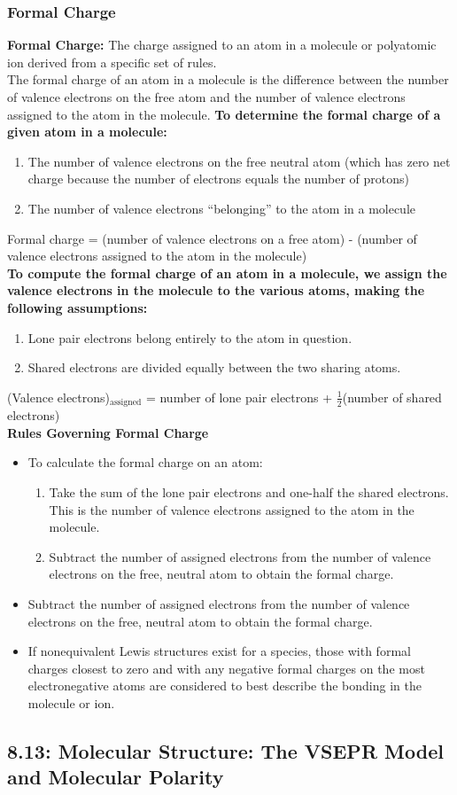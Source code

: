 \documentclass[12pt]{extarticle}
\begin{document}
\subsubsection*{Formal Charge}
\textbf{Formal Charge:}
The charge assigned to an atom in a molecule or polyatomic ion derived from a specific set of rules.
\\The formal charge of an atom in a molecule is  the difference between the number of valence electrons on the free atom and the number of valence electrons assigned to the atom in the molecule.
\textbf{To determine the formal charge of a given atom in a molecule:}
\begin{enumerate}
    \item The number of valence electrons on the free neutral atom (which has zero net charge because the number of electrons equals the number of protons)
    \item The number of valence electrons “belonging” to the atom in a molecule
\end{enumerate}
Formal charge = (number of valence electrons on a free atom) - (number of valence electrons assigned to the atom in the molecule)
\\\textbf{To compute the formal charge of an atom in a molecule, we assign the valence electrons in the molecule to the various atoms, making the following assumptions:}
\begin{enumerate}
    \item Lone pair electrons belong entirely to the atom in question.
    \item Shared electrons are divided equally between the two sharing atoms.
\end{enumerate}
(Valence electrons)$_{\text{assigned}}$ = number of lone pair electrons + $\frac{1}{2}$(number of shared electrons)
\\\textbf{Rules Governing Formal Charge}
\begin{itemize}
    \item To calculate the formal charge on an atom:
    \begin{enumerate}
        \item Take the sum of the lone pair electrons and one-half the shared electrons. This is the number of valence electrons assigned to the atom in the molecule.
        \item Subtract the number of assigned electrons from the number of valence electrons on the free, neutral atom to obtain the formal charge.
    \end{enumerate}
    \item Subtract the number of assigned electrons from the number of valence electrons on the free, neutral atom to obtain the formal charge.
    \item If nonequivalent Lewis structures exist for a species, those with formal charges closest to zero and with any negative formal charges on the most electronegative atoms are considered to best describe the bonding in the molecule or ion.
\end{itemize}

\subsection*{8.13: Molecular Structure: The VSEPR Model and Molecular Polarity}
\end{document}
